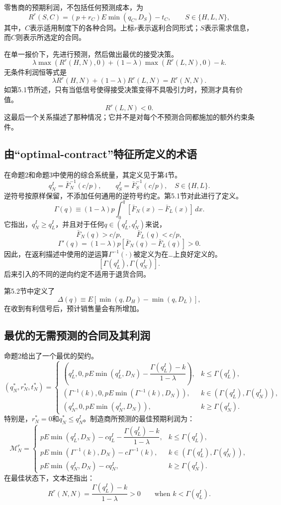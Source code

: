 \documentclass{article}
\begin{document}
零售商的预期利润，不包括任何预测成本，为
\[
R^r(S,C)=(p+r_C)E\min(q_C,D_S)-t_C,
\qquad S\in\{H,L,N\},
\]
其中，$C$表示适用制度下的各种合同。上标$r$表示返利合同形式；$S$表示需求信息，而$C$则表示所选定的合同。

在单一报价下，先进行预测，然后做出最优的接受决策。
\[
\lambda\max(R^r(H,N),0)
 +(1-\lambda)\max(R^r(L,N),0)-k.
\]
无条件利润恒等式是
\[
\lambda R^r(H,N)+(1-\lambda)R^r(L,N)=R^r(N,N).
\]
如第5.1节所述，只有当低信号使得接受决策变得不具吸引力时，预测才具有价值。
\[
R^r(L,N)<0.
\]
这最后一个关系描述了那种情况；它并不是对每个不预测合同都施加的额外约束条件。

\subsection*{由“optimal-contract”特征所定义的术语}
在命题2和命题3中使用的综合系统量，其定义见于第4节。
\[
q_N^I=\bar F_N^{-1}(c/p),\qquad
q_S^I=\bar F_S^{-1}(c/p),\quad S\in\{H,L\}.
\]
逆符号按原样保留，不添加任何通用的逆符号约定。第5.1节对此进行了定义。
\[
\Gamma(q)\equiv(1-\lambda)p\int_0^q
 [\bar F_N(x)-\bar F_L(x)]\,dx.
\]
它指出，$q_N^I\geq q_L^I$，并且对于任何$q\in(q_L^I,q_N^I)$来说，
\[
\bar F_N(q)>c/p,\qquad \bar F_L(q)<c/p,
\]
\[
\Gamma'(q)=(1-\lambda)p[\bar F_N(q)-\bar F_L(q)]>0.
\]
因此，在返利描述中使用的逆运算$\Gamma^{-1}(\cdot)$被定义为在…上良好定义的。
\[
[\Gamma(q_L^I),\Gamma(q_N^I)].
\]
后来引入的不同的逆向约定不适用于退货合同。

第5.2节中定义了
\[
\Delta(q)\equiv E[\min(q,D_H)-\min(q,D_L)],
\]
在收到有利信号后，预计销售量会有所增加。

\subsection*{最优的无需预测的合同及其利润}
命题2给出了一个最优的契约。
\[
(q_N^*,r_N^*,t_N^*)=
\begin{cases}
\left(q_L^I,0,pE\min(q_L^I,D_N)
 -\dfrac{\Gamma(q_L^I)-k}{1-\lambda}\right),
 &k\leq\Gamma(q_L^I),\\[6pt]
\left(\Gamma^{-1}(k),0,pE\min(\Gamma^{-1}(k),D_N)\right),
 &k\in(\Gamma(q_L^I),\Gamma(q_N^I)),\\[6pt]
\left(q_N^I,0,pE\min(q_N^I,D_N)\right),
 &k\geq\Gamma(q_N^I).
\end{cases}
\]
特别是，$r_N^*=0$和$q_N^*\leq q_N^I$。制造商所预测的最佳预期利润为：
\begin{equation}
\mathcal M_N^r=
\begin{cases}
pE\min(q_L^I,D_N)-cq_L^I
 -\dfrac{\Gamma(q_L^I)-k}{1-\lambda},
 &k\leq\Gamma(q_L^I),\\[6pt]
pE\min(\Gamma^{-1}(k),D_N)-c\Gamma^{-1}(k),
 &k\in(\Gamma(q_L^I),\Gamma(q_N^I)),\\[6pt]
pE\min(q_N^I,D_N)-cq_N^I,
 &k\geq\Gamma(q_N^I).
\end{cases}
\tag{1}
\end{equation}
在最佳状态下，文本还指出：
\[
R^r(N,N)=\frac{\Gamma(q_L^I)-k}{1-\lambda}>0
\qquad\text{when }k<\Gamma(q_L^I).
\]
\end{document}
